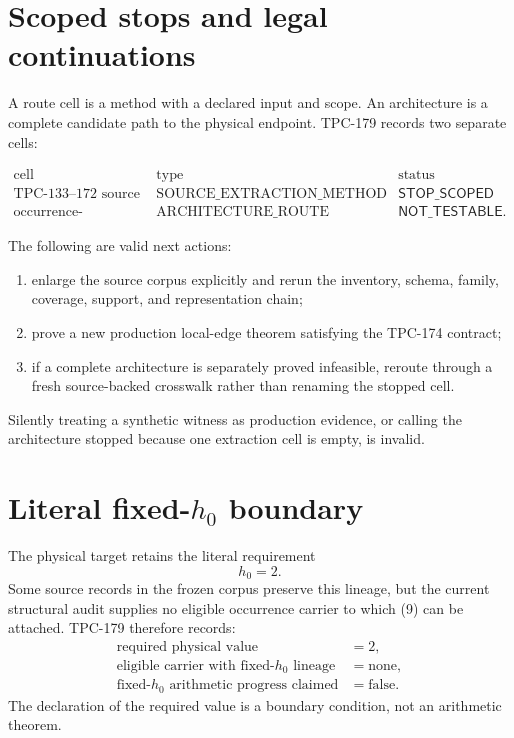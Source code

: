 \documentclass[11pt]{article}
\theoremstyle{definition}
\theoremstyle{remark}
\begin{document}
\section{Scoped stops and legal continuations}

A route cell is a method with a declared input and scope.  An
architecture is a complete candidate path to the physical endpoint.
TPC-179 records two separate cells:

\[
\begin{array}{c|c|c}
\text{cell}&\text{type}&\text{status}\\ \hline
\text{TPC-133--172 source extraction}&
\text{SOURCE\_EXTRACTION\_METHOD}&\mathsf{STOP\_SCOPED}\\
\text{occurrence-augmented H1 path}&
\text{ARCHITECTURE\_ROUTE}&\mathsf{NOT\_TESTABLE}.
\end{array}                                                       \tag{8}
\]

The following are valid next actions:

\begin{enumerate}[leftmargin=*]
\item enlarge the source corpus explicitly and rerun the inventory,
      schema, family, coverage, support, and representation chain;
\item prove a new production local-edge theorem satisfying the
      TPC-174 contract;
\item if a complete architecture is separately proved infeasible,
      reroute through a fresh source-backed crosswalk rather than
      renaming the stopped cell.
\end{enumerate}

Silently treating a synthetic witness as production evidence, or
calling the architecture stopped because one extraction cell is
empty, is invalid.

\section{Literal fixed-\texorpdfstring{\(h_0\)}{h0} boundary}

The physical target retains the literal requirement
\[
 h_0=2.                                                          \tag{9}
\]
Some source records in the frozen corpus preserve this lineage, but
the current structural audit supplies no eligible occurrence carrier
to which (9) can be attached.  TPC-179 therefore records:
\[
\begin{aligned}
 \text{required physical value}&=2,\\
 \text{eligible carrier with fixed-}h_0\text{ lineage}&=\text{none},\\
 \text{fixed-}h_0\text{ arithmetic progress claimed}&=\text{false}.
\end{aligned}                                                     \tag{10}
\]
The declaration of the required value is a boundary condition, not
an arithmetic theorem.
\end{document}

